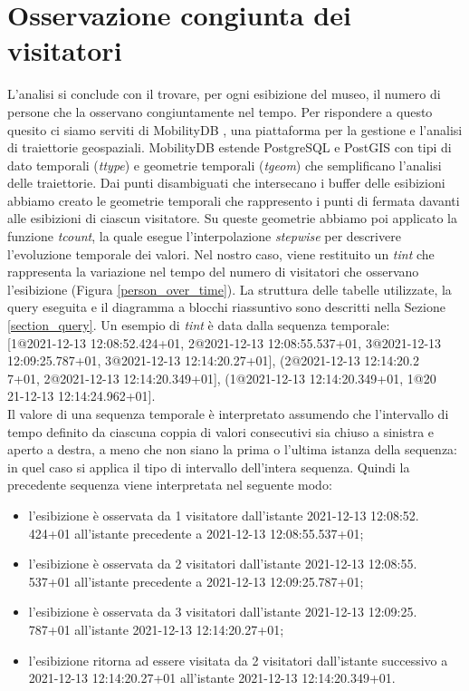 \documentclass[12pt]{article}
\begin{document}
\section{Osservazione congiunta dei visitatori}
L'analisi si conclude con il trovare, per ogni esibizione del museo, il numero di persone che la osservano congiuntamente nel tempo.
Per rispondere a questo quesito ci siamo serviti di MobilityDB \cite{MobilityDBTODS2020}, una piattaforma per la gestione e l'analisi di traiettorie geospaziali.
MobilityDB estende PostgreSQL e PostGIS con tipi di dato temporali (\emph{ttype}) e geometrie temporali (\emph{tgeom}) che semplificano l'analisi delle traiettorie.
Dai punti disambiguati che intersecano i buffer delle esibizioni abbiamo creato le geometrie temporali che rappresento i punti di fermata davanti alle esibizioni di ciascun visitatore.
Su queste geometrie abbiamo poi applicato la funzione \emph{tcount}, la quale esegue l'interpolazione \emph{stepwise} per descrivere l'evoluzione temporale dei valori.
Nel nostro caso, viene restituito un \emph{tint} che rappresenta la variazione nel tempo del numero di visitatori che osservano l'esibizione (Figura \ref{person_over_time}).
La struttura delle tabelle utilizzate, la query eseguita e il diagramma a blocchi riassuntivo sono descritti nella Sezione \ref{section_query}.
Un esempio di \emph{tint} è data dalla sequenza temporale: \\
{[1@2021-12-13 12:08:52.424+01, 2@2021-12-13 12:08:55.537+01, 3@2021-12-13 12:09:25.787+01, 3@2021-12-13 12:14:20.27+01], (2@2021-12-13 12:14:20.2\\7+01, 2@2021-12-13 12:14:20.349+01], (1@2021-12-13 12:14:20.349+01, 1@20\\21-12-13 12:14:24.962+01]}.\\
Il valore di una sequenza temporale è interpretato assumendo che l'intervallo di tempo definito da ciascuna coppia di valori consecutivi sia chiuso a sinistra e aperto a destra, a meno che non siano la prima o l'ultima istanza della sequenza: in quel caso si applica il tipo di intervallo dell'intera sequenza.
Quindi la precedente sequenza viene interpretata nel seguente modo:
\begin{itemize}
    \item l'esibizione è osservata da 1 visitatore dall'istante 2021-12-13 12:08:52.\\424+01 all'istante precedente a 2021-12-13 12:08:55.537+01;
    \item l'esibizione è osservata da 2 visitatori dall'istante 2021-12-13 12:08:55.\\537+01 all'istante precedente a 2021-12-13 12:09:25.787+01;
    \item l'esibizione è osservata da 3 visitatori dall'istante 2021-12-13 12:09:25.\\787+01 all'istante 2021-12-13 12:14:20.27+01;
    \item l'esibizione ritorna ad essere visitata da 2 visitatori dall'istante successivo a 2021-12-13 12:14:20.27+01 all'istante 2021-12-13 12:14:20.349+01.
\end{itemize}
\end{document}
